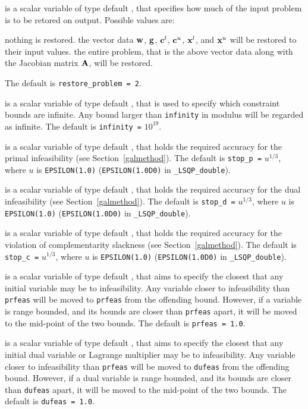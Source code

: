 \documentclass{galahad}
\newcommand{\packagename}{LSQP}
\newcommand{\fullpackagename}{\libraryname\_\-\packagename}
\begin{document}
\begin{description}
 is a scalar variable of type default \integer, that 
specifies how much of the input problem is to be retored on output. 
Possible values are:
\begin{description}
 nothing is restored. 
 the vector data ${\mathbf{w}}$, ${\mathbf{g}}$, 
   ${\mathbf{c}}^{l}$, ${\mathbf{c}}^{u}$, ${\mathbf{x}}^{l}$, and ${\mathbf{x}}^{u}$ 
   will be restored to their input values.
 the entire problem, that is the above vector data along with 
the Jacobian matrix ${\mathbf{A}}$, will be restored.
\end{description}
The default is {\tt restore\_problem = 2}.

 is a scalar variable of type default \realdp, that is used to
specify which constraint bounds are infinite.
Any bound larger than {\tt infinity} in modulus will be regarded as infinite.
The default is {\tt infinity =} $10^{19}$.

 is a scalar variable of type default \realdp, that holds the
required accuracy for the primal infeasibility (see Section~\ref{galmethod}).
The default is {\tt stop\_p =} $u^{1/3}$,
where $u$ is {\tt EPSILON(1.0)} ({\tt EPSILON(1.0D0)} in 
{\tt \fullpackagename\_double}).

 is a scalar variable of type default 
\realdp, that holds the
required accuracy for the dual infeasibility (see Section~\ref{galmethod}).
The default is {\tt stop\_d =} $u^{1/3}$,
where $u$ is {\tt EPSILON(1.0)} ({\tt EPSILON(1.0D0)} in 
{\tt \fullpackagename\_double}).

 is a scalar variable of type default 
\realdp, that holds the
required accuracy for the violation of complementarity slackness 
(see Section~\ref{galmethod}).
The default is {\tt stop\_c =} $u^{1/3}$,
where $u$ is {\tt EPSILON(1.0)} ({\tt EPSILON(1.0D0)} in 
{\tt \fullpackagename\_double}).

 is a scalar variable of type default \realdp, that aims to specify
the closest that any initial variable may be to infeasibility. Any variable
closer to infeasibility than {\tt prfeas} will be moved to {\tt prfeas} from 
the offending bound. However, if a variable is range bounded, and its bounds 
are closer than {\tt prfeas} apart, it will be moved to the mid-point of the 
two bounds.
The default is {\tt prfeas = 1.0}.

 is a scalar variable of type default \realdp, that aims to specify
the closest that any initial dual variable or Lagrange multiplier may be to 
infeasibility. Any variable closer to infeasibility than {\tt prfeas} will be
moved to {\tt dufeas} from the offending bound. However, if a dual variable
is range bounded, and its bounds are closer than {\tt dufeas} apart, it will
be moved to the mid-point of the two bounds.
The default is {\tt dufeas = 1.0}.


\end{description}
\end{document}
